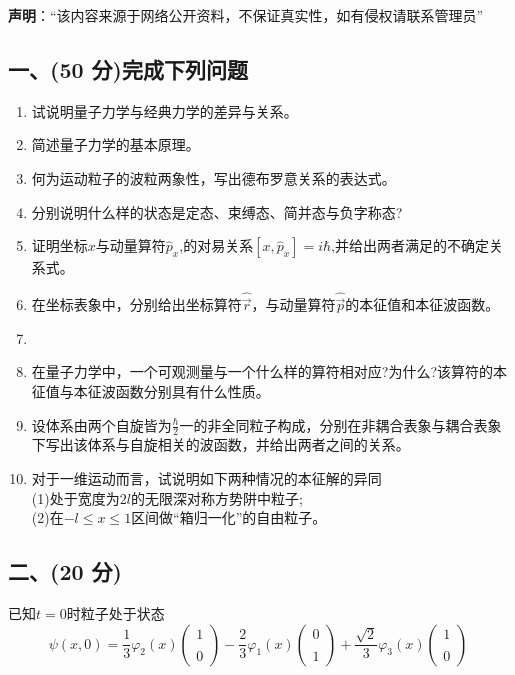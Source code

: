 
\textbf{声明}：“该内容来源于网络公开资料，不保证真实性，如有侵权请联系管理员”

\subsection{一、(50 分)完成下列问题}
\begin{enumerate}
\item 试说明量子力学与经典力学的差异与关系。
\item 简述量子力学的基本原理。
\item 何为运动粒子的波粒两象性，写出德布罗意关系的表达式。
\item 分别说明什么样的状态是定态、束缚态、简并态与负字称态?
\item 证明坐标$x$与动量算符$\hat{p}_x$,的对易关系$[x,\hat{p}_x]=i\hbar$,并给出两者满足的不确定关系式。
\item 在坐标表象中，分别给出坐标算符$\hat{\vec{r}}$，与动量算符$\hat{\vec{p}}$的本征值和本征波函数。
\item 
\item 在量子力学中，一个可观测量与一个什么样的算符相对应?为什么?该算符的本征值与本征波函数分别具有什么性质。
\item 设体系由两个自旋皆为$\frac{\hbar}{2}$一的非全同粒子构成，分别在非耦合表象与耦合表象下写出该体系与自旋相关的波函数，并给出两者之间的关系。
\item 对于一维运动而言，试说明如下两种情况的本征解的异同\\
(1)处于宽度为$2l$的无限深对称方势阱中粒子;\\
(2)在$-l\leq x \leq1$区间做“箱归一化”的自由粒子。
\end{enumerate}
\subsection{二、(20 分)}
已知$t=0$时粒子处于状态
$$\psi(x,0) = \frac{1}{3} \varphi_2(x) 
\begin{pmatrix}
1 \\\\
0
\end{pmatrix}
-\frac{2}{3} \varphi_1(x) 
\begin{pmatrix}
0 \\\\
1
\end{pmatrix}
+ \frac{\sqrt{2}}{3} \varphi_3(x)
\begin{pmatrix}
1 \\\\
0
\end{pmatrix}~$$